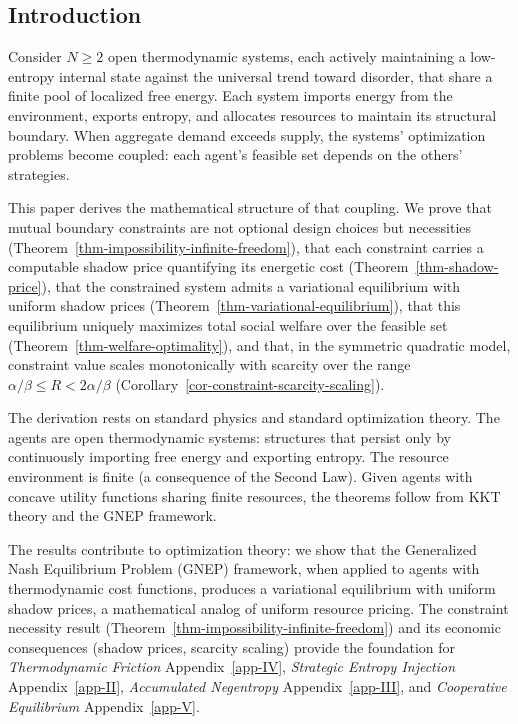 \documentclass[11pt]{article}
\theoremstyle{plain}
\theoremstyle{definition}
\theoremstyle{remark}
\let\origsubsection\subsection
\renewcommand{\subsection}{\needspace{7\baselineskip}\origsubsection}
\begin{document}
\subsection{Introduction}\label{introduction-1}

Consider \(N \geq 2\) open thermodynamic systems, each actively
maintaining a low-entropy internal state against the universal trend
toward disorder, that share a finite pool of localized free energy. Each
system imports energy from the environment, exports entropy, and
allocates resources to maintain its structural boundary. When aggregate
demand exceeds supply, the systems' optimization problems become
coupled: each agent's feasible set depends on the others' strategies.

This paper derives the mathematical structure of that coupling. We prove
that mutual boundary constraints are not optional design choices but
necessities (Theorem~\ref{thm-impossibility-infinite-freedom}), that
each constraint carries a computable shadow price quantifying its
energetic cost (Theorem~\ref{thm-shadow-price}), that the constrained
system admits a variational equilibrium with uniform shadow prices
(Theorem~\ref{thm-variational-equilibrium}), that this equilibrium
uniquely maximizes total social welfare over the feasible set
(Theorem~\ref{thm-welfare-optimality}), and that, in the symmetric
quadratic model, constraint value scales monotonically with scarcity
over the range \(\alpha/\beta \leq R < 2\alpha/\beta\)
(Corollary~\ref{cor-constraint-scarcity-scaling}).

The derivation rests on standard physics and standard optimization
theory. The agents are open thermodynamic systems: structures that
persist only by continuously importing free energy and exporting
entropy. The resource environment is finite (a consequence of the Second
Law). Given agents with concave utility functions sharing finite
resources, the theorems follow from KKT theory and the GNEP framework.

The results contribute to optimization theory: we show that the
Generalized Nash Equilibrium Problem (GNEP) framework, when applied to
agents with thermodynamic cost functions, produces a variational
equilibrium with uniform shadow prices, a mathematical analog of uniform
resource pricing. The constraint necessity result
(Theorem~\ref{thm-impossibility-infinite-freedom}) and its economic
consequences (shadow prices, scarcity scaling) provide the foundation
for \emph{Thermodynamic Friction} Appendix~\ref{app-IV}, \emph{Strategic
Entropy Injection} Appendix~\ref{app-II}, \emph{Accumulated Negentropy}
Appendix~\ref{app-III}, and \emph{Cooperative Equilibrium}
Appendix~\ref{app-V}.
\end{document}
